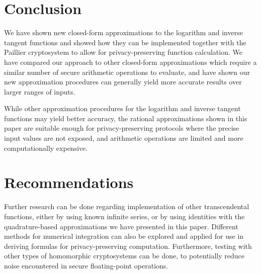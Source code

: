 \section{Conclusion}
We have shown new closed-form approximations to the logarithm and inverse tangent functions and showed how they can be implemented together with the Paillier cryptosystem to allow for privacy-preserving function calculation. We have compared our approach to other closed-form approximations which require a similar number of secure arithmetic operations to evaluate, and have shown our new approximation procedures can generally yield more accurate results over larger ranges of inputs.

While other approximation procedures for the logarithm and inverse tangent functions may yield better accuracy, the rational approximations shown in this paper are suitable enough for privacy-preserving protocols where the precise input values are not exposed, and arithmetic operations are limited and more computationally expensive.

\section{Recommendations}
Further research can be done regarding implementation of other transcendental functions, either by using known infinite series, or by using identities with the quadrature-based approximations we have presented in this paper. Different methods for numerical integration can also be explored and applied for use in deriving formulas for privacy-preserving computation. Furthermore, testing with other types of homomorphic cryptosystems can be done, to potentially reduce noise encountered in secure floating-point operations.
